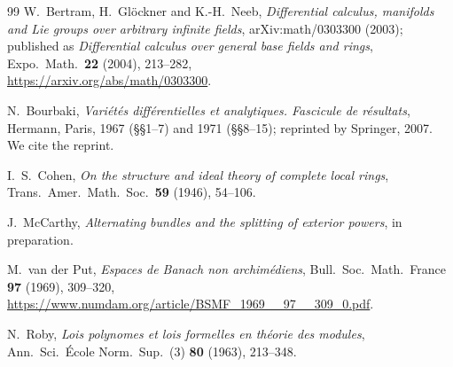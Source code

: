 \begin{thebibliography}{99}
 W.~Bertram, H.~Gl\"ockner and K.-H.~Neeb,
\emph{Differential calculus, manifolds and Lie groups over arbitrary infinite fields},
arXiv:math/0303300 (2003); published as \emph{Differential calculus over general base fields and rings}, Expo.\ Math.\ \textbf{22} (2004), 213--282,\\
{\small\url{https://arxiv.org/abs/math/0303300}}.

 N.~Bourbaki, \emph{Vari\'et\'es diff\'erentielles et analytiques. Fascicule de r\'esultats}, Hermann, Paris,
1967 (\S\S1--7) and 1971 (\S\S8--15); reprinted by Springer, 2007. We cite the reprint.

 I.~S.~Cohen, \emph{On the structure and ideal theory of complete local rings}, Trans.\ Amer.\ Math.\ Soc.\
\textbf{59} (1946), 54--106.

 J.~McCarthy, \emph{Alternating bundles and the splitting of exterior powers}, in preparation.

 M.~van der Put, \emph{Espaces de Banach non archim\'ediens}, Bull.\ Soc.\ Math.\ France
\textbf{97} (1969), 309--320,\\
{\small\url{https://www.numdam.org/article/BSMF_1969__97__309_0.pdf}}.

 N.~Roby, \emph{Lois polynomes et lois formelles en th\'eorie des modules}, Ann.\ Sci.\ \'Ecole Norm.\
Sup.\ (3) \textbf{80} (1963), 213--348.

\end{thebibliography}
